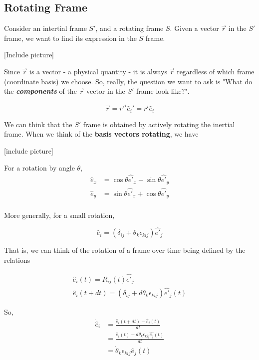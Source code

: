 \documentclass[11pt]{article}
\begin{document}
\vskip 1cm
\subsection{Rotating Frame}

Consider an intertial frame $S'$, and a rotating frame $S$. Given a vector $\vec{r}$ in the $S'$ frame, we want to find its expression in the $S$ frame.

\vskip 0.5cm
[Include picture]
\vskip 0.5cm

Since $\vec{r}$ is a vector - a physical quantity - it is always $\vec{r}$ regardless of which frame (coordinate basis) we choose. So, really, the question we want to ask is "What do the \emph{\textbf{components}} of the $\vec{r}$ vector in the $S'$ frame look like?".

\[  \vec{r} = r'^i \hat{e}_i' = r^i \hat{e}_i  \]

We can think that the $S'$ frame is obtained by actively rotating the inertial frame. When we think of the \textbf{basis vectors rotating}, we have

\vskip 0.5cm
[include picture]
\vskip 0.5cm

For a rotation by angle $\theta$,
\begin{align*}
  \hat{e}_{x} &= \cos\theta \hat{e'}_x - \sin\theta \hat{e'}_y \\
  \hat{e}_{y} &= \sin\theta \hat{e'}_x + \cos\theta \hat{e'}_y \\
\end{align*}

More generally, for a small rotation,

\[ \hat{e}_i = \left(\delta_{ij} + \theta_k \epsilon_{kij} \right) \hat{e'}_j \]

That is, we can think of the rotation of a frame over time being defined by the relations

\begin{align*}
  \hat{e}_i(t) = R_{ij}(t) \hat{e'}_j \\
  \hat{e}_i(t + dt) = \left(\delta_{ij} + d\theta_k \epsilon_{kij} \right) \hat{e'}_j (t)
\end{align*}

So,
\begin{align*}
  \dot{\hat{e}}_i &= \frac{\hat{e}_i (t + dt) - \hat{e}_i(t)}{dt} \\
  &= \frac{\hat{e}_i(t) + d\theta_k \epsilon_{kij} \hat{e_j}(t) }{dt} \\
  &= \dot{\theta}_k \epsilon_{kij} \hat{e}_j(t)
\end{align*}
\end{document}
